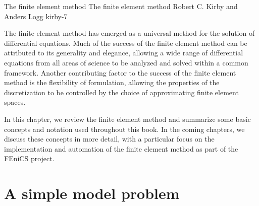               {The finite element method}
              {The finite element method}
              {Robert C. Kirby and Anders Logg}
              {kirby-7}

The finite element method has emerged as a universal method for the
solution of differential equations. Much of the success of the finite
element method can be attributed to its generality and elegance,
allowing a wide range of differential equations from all areas of
science to be analyzed and solved within a common framework. Another
contributing factor to the success of the finite element method is the
flexibility of formulation, allowing the properties of the
discretization to be controlled by the choice of approximating finite
element spaces.

In this chapter, we review the finite element method and summarize
some basic concepts and notation used throughout this book. In the
coming chapters, we discuss these concepts in more detail, with a
particular focus on the implementation and automation of the finite
element method as part of the FEniCS project.

\section{A simple model problem}

